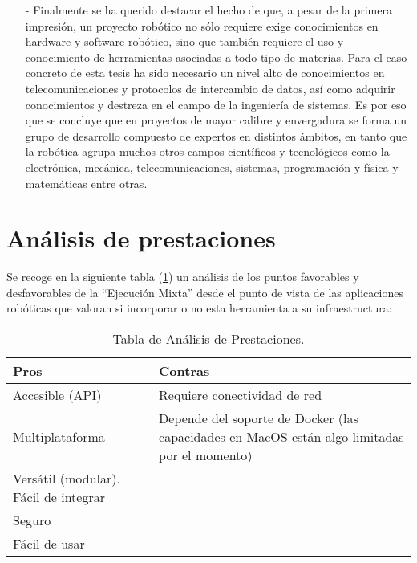\begin{itemize}
    \item [-] Finalmente se ha querido destacar el hecho de que, a pesar de la primera impresión, un proyecto robótico no sólo requiere exige conocimientos en hardware y software robótico, sino que también requiere el uso y conocimiento de herramientas asociadas a todo tipo de materias. Para el caso concreto de esta tesis ha sido necesario un nivel alto de conocimientos en telecomunicaciones y protocolos de intercambio de datos, así como adquirir conocimientos y destreza en el campo de la ingeniería de sistemas. Es por eso que se concluye que en proyectos de mayor calibre y envergadura se forma un grupo de desarrollo compuesto de expertos en distintos ámbitos, en tanto que la robótica agrupa muchos otros campos científicos y tecnológicos como la electrónica, mecánica, telecomunicaciones, sistemas, programación y física y matemáticas entre otras.
\end{itemize}

\section{Análisis de prestaciones}
Se recoge en la siguiente tabla (\ref{tabla:pros_cons}) un análisis de los puntos favorables y desfavorables de la ``Ejecución Mixta'' desde el punto de vista de las aplicaciones robóticas que valoran si incorporar o no esta herramienta a su infraestructura:

\begin{table}[htbp]
\begin{center}
\begin{tabular}{| p{5cm}| p{8cm} |}
\hline
Pros & Contras \\
\hline \hline
Accesible (API) & Requiere conectividad de red \\ \hline
Multiplataforma & Depende del soporte de Docker (las capacidades en MacOS están algo limitadas por el momento)\\ \hline
Versátil (modular). Fácil de integrar &   \\ \hline
Seguro &   \\ \hline
Fácil de usar &   \\ \hline
\end{tabular}
\caption{Tabla de Análisis de Prestaciones.}
\label{tabla:pros_cons}
\end{center}
\end{table}

